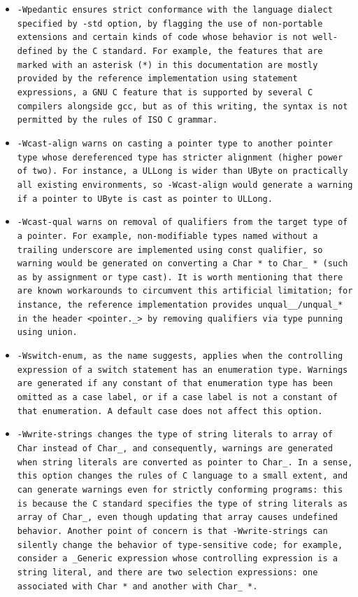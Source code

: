 \begin{itemize}
\item \tt{-Wpedantic} ensures strict conformance with the language dialect
specified by \tt{-std} option, by flagging the use of non-portable extensions
and certain kinds of code whose behavior is not well-defined by the C standard.
For example, the features that are marked with an asterisk (*) in this
documentation are mostly provided by the reference implementation
using statement expressions, a GNU C feature that is supported by
several C compilers alongside \tt{gcc}, but as of this writing,
the syntax is not permitted by the rules of ISO C grammar.

\item \tt{-Wcast-align} warns on casting a pointer type to another pointer
type whose dereferenced type has stricter alignment (higher power of two).
For instance, a \tt{ULLong} is wider than \tt{UByte} on practically
all existing environments, so \tt{-Wcast-align} would generate a
warning if a pointer to \tt{UByte} is cast as pointer to \tt{ULLong}.

\item \tt{-Wcast-qual} warns on removal of
qualifiers from the target type of a pointer.
For example, non-modifiable types named without a trailing underscore are
implemented using \tt{const} qualifier, so warning would be generated on
converting a \tt{Char *} to \tt{Char_ *} (such as by assignment or type cast).
It is worth mentioning that there are known workarounds to circumvent
this artificial limitation; for instance, the reference implementation
provides \tt{unqual__}/\tt{unqual_}* in the header \tt{<pointer._>}
by removing qualifiers via type punning using \tt{union}.

\item \tt{-Wswitch-enum}, as the name suggests, applies when the
controlling expression of a \tt{switch} statement has an enumeration type.
Warnings are generated if any constant of that enumeration type has been omitted
as a case label, or if a case label is not a constant of that enumeration.
A \tt{default} case does not affect this option.

\item \tt{-Wwrite-strings} changes the type of string literals to array
of \tt{Char} instead of \tt{Char_}, and consequently, warnings are
generated when string literals are converted as pointer to \tt{Char_}.
In a sense, this option changes the rules of C language to a small extent,
and can generate warnings even for strictly conforming programs:
this is because the C standard specifies the type of string literals as array
of \tt{Char_}, even though updating that array causes undefined behavior.
Another point of concern is that \tt{-Wwrite-strings} can silently change the
behavior of type-sensitive code; for example, consider a \tt{_Generic} expression
whose controlling expression is a string literal, and there are two selection
expressions: one associated with \tt{Char *} and another with \tt{Char_ *}.


\end{itemize}
